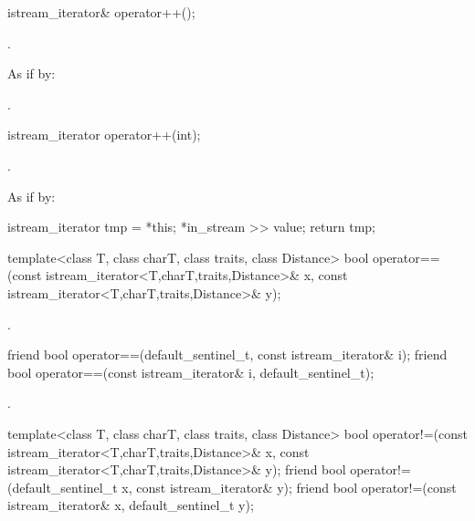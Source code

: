 %
\begin{itemdecl}
istream_iterator& operator++();
\end{itemdecl}

\begin{itemdescr}
\pnum
\requires {}.

\pnum
\effects
As if by: 

\pnum
\returns
{}.
\end{itemdescr}

%
\begin{itemdecl}
istream_iterator operator++(int);
\end{itemdecl}

\begin{itemdescr}
\pnum
\requires {}.

\pnum
\effects
As if by:
\begin{codeblock}
istream_iterator tmp = *this;
*in_stream >> value;
return tmp;
\end{codeblock}
\end{itemdescr}

%
\begin{itemdecl}
template<class T, class charT, class traits, class Distance>
  bool operator==(const istream_iterator<T,charT,traits,Distance>& x,
                  const istream_iterator<T,charT,traits,Distance>& y);
\end{itemdecl}

\begin{itemdescr}
\pnum
\returns
{}.
\end{itemdescr}

%
\begin{itemdecl}
friend bool operator==(default_sentinel_t, const istream_iterator& i);
friend bool operator==(const istream_iterator& i, default_sentinel_t);
\end{itemdecl}

\begin{itemdescr}
\pnum
\returns
{}.
\end{itemdescr}

%
\begin{itemdecl}
template<class T, class charT, class traits, class Distance>
  bool operator!=(const istream_iterator<T,charT,traits,Distance>& x,
                  const istream_iterator<T,charT,traits,Distance>& y);
friend bool operator!=(default_sentinel_t x, const istream_iterator& y);
friend bool operator!=(const istream_iterator& x, default_sentinel_t y);
\end{itemdecl}

